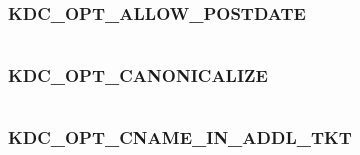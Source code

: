 \documentclass[letterpaper,10pt,english]{sphinxmanual}
\begin{document}
\subsubsection{KDC\_OPT\_ALLOW\_POSTDATE}
\label{appdev/refs/macros/KDC_OPT_ALLOW_POSTDATE:kdc-opt-allow-postdate}\label{appdev/refs/macros/KDC_OPT_ALLOW_POSTDATE:kdc-opt-allow-postdate-data}\label{appdev/refs/macros/KDC_OPT_ALLOW_POSTDATE::doc}

\begin{fulllineitems}
\label{appdev/refs/macros/KDC_OPT_ALLOW_POSTDATE:KDC_OPT_ALLOW_POSTDATE}
\end{fulllineitems}


\begin{tabulary}{\linewidth}{|L|L|}
\hline

 & 
\\
\hline\end{tabulary}



\subsubsection{KDC\_OPT\_CANONICALIZE}
\label{appdev/refs/macros/KDC_OPT_CANONICALIZE:kdc-opt-canonicalize}\label{appdev/refs/macros/KDC_OPT_CANONICALIZE:kdc-opt-canonicalize-data}\label{appdev/refs/macros/KDC_OPT_CANONICALIZE::doc}

\begin{fulllineitems}
\label{appdev/refs/macros/KDC_OPT_CANONICALIZE:KDC_OPT_CANONICALIZE}
\end{fulllineitems}


\begin{tabulary}{\linewidth}{|L|L|}
\hline

 & 
\\
\hline\end{tabulary}



\subsubsection{KDC\_OPT\_CNAME\_IN\_ADDL\_TKT}
\label{appdev/refs/macros/KDC_OPT_CNAME_IN_ADDL_TKT:kdc-opt-cname-in-addl-tkt-data}\label{appdev/refs/macros/KDC_OPT_CNAME_IN_ADDL_TKT:kdc-opt-cname-in-addl-tkt}\label{appdev/refs/macros/KDC_OPT_CNAME_IN_ADDL_TKT::doc}
\end{document}

